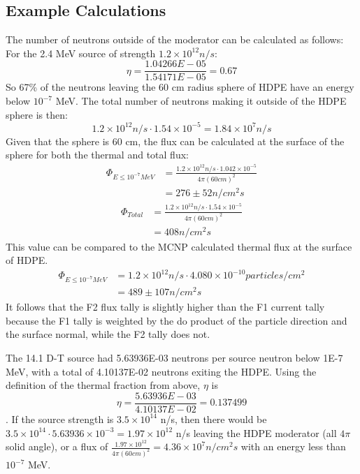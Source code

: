 \documentclass[draftcls,onecolumn]{IEEEtran}
\begin{document}
\subsection{Example Calculations}
The number of neutrons outside of the moderator can be calculated as follows:
For the 2.4 MeV source of strength $1.2\times10^{12} n/s$:
\begin{equation}
\eta = \frac{1.04266E-05}{1.54171E-05} = 0.67
\end{equation}
So 67\% of the neutrons leaving the 60 cm radius sphere of HDPE have an energy below $10^{-7}$ MeV. 
The total number of neutrons making it outside of the HDPE sphere is then:
\begin{equation}
1.2\times10^{12} n/s \cdot 1.54\times10^{-5} = 1.84\times10^{7} n/s
\end{equation}
Given that the sphere is 60 cm, the flux can be calculated at the surface of the sphere for both the thermal and total flux:
\begin{align}
    \Phi_{E\le10^{-7} MeV} &= \frac{1.2\times10^{12} n/s \cdot 1.042\times10^{-5}}{4\pi (60 cm)^2} \\
                           &= 276 \pm 52 n/cm^2 s 
\end{align}
\begin{align}
    \Phi_{Total} &= \frac{1.2\times10^{12} n/s \cdot 1.54\times10^{-5}}{4\pi (60 cm)^2} \\
                  &= 408 n/cm^2 s
\end{align}
This value can be compared to the MCNP calculated thermal flux at the surface of HDPE.
\begin{align}
    \Phi_{E\le10^{-7} MeV} &= 1.2\times10^{12} n/s \cdot  4.080 \times10^{-10} particles/cm^2\\
                           &= 489 \pm 107 n/cm^2s 
\end{align}
It follows that the F2 flux tally is slightly higher than the F1 current tally because the F1 tally is weighted by the do product of the particle direction and the surface normal, while the F2 tally does not.

The 14.1 D-T source had 5.63936E-03 neutrons per source neutron below 1E-7 MeV, with a total of 4.10137E-02 neutrons exiting the HDPE.
Using the definition of the thermal fraction from above, $\eta$ is
\begin{equation}
\eta = \frac{5.63936E-03}{4.10137E-02} = 0.137499
\end{equation}.
If the source strength is $3.5\times10^{14}$ n/s, then there would be $3.5\times10^{14} \cdot 5.63936\times10^{-3} = 1.97\times10^{12}$ n/s leaving the HDPE moderator (all $4\pi$ solid angle), or a flux of $\frac{1.97\times10^{12}}{4\pi (60 cm)^2} = 4.36\times10^{7} n/cm^2 s$ with an energy less than $10^{-7}$ MeV.
\end{document}
